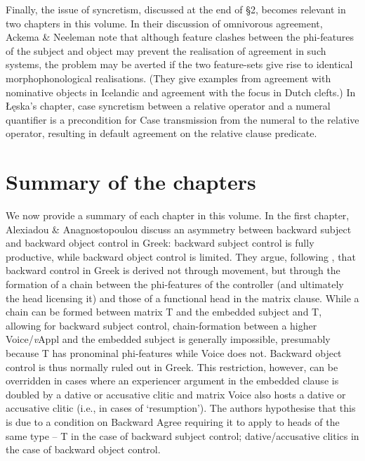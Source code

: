 \documentclass[output=paper]{langsci/langscibook}
\begin{document}
Finally, the issue of syncretism, discussed at the end of §2, becomes relevant in two chapters in this volume. In their discussion of omnivorous agreement, Ackema \& Neeleman note that although feature clashes between the phi-features of the subject and object may prevent the realisation of agreement in such systems, the problem may be averted if the two feature-sets give rise to identical morphophonological realisations. (They give examples from agreement with nominative objects in Icelandic and agreement with the focus in Dutch clefts.) In Łęska’s chapter, case syncretism between a relative operator and a numeral quantifier is a precondition for Case transmission from the numeral to the relative operator, resulting in default agreement on the relative clause predicate.

\section{Summary of the chapters}

We now provide a summary of each chapter in this volume. In the first chapter, Alexiadou \& Anagnostopoulou discuss an asymmetry between backward subject and backward object control in Greek: backward subject control is fully productive, while backward object control is limited. They argue, following \citet{Tsakali2017}, that backward control in Greek is derived not through movement, but through the formation of a chain between the phi-features of the controller (and ultimately the head licensing it) and those of a functional head in the matrix clause. While a chain can be formed between matrix T and the embedded subject and T, allowing for backward subject control, chain-formation between a higher Voice/\textit{v}Appl and the embedded subject is generally impossible, presumably because T has pronominal phi-features while Voice does not. Backward object control is thus normally ruled out in Greek. This restriction, however, can be overridden in cases where an experiencer argument in the embedded clause is doubled by a dative or accusative clitic and matrix Voice also hosts a dative or accusative clitic (i.e., in cases of ‘resumption’). The authors hypothesise that this is due to a condition on Backward Agree requiring it to apply to heads of the same type – T in the case of backward subject control; dative/accusative clitics in the case of backward object control.
\end{document}
